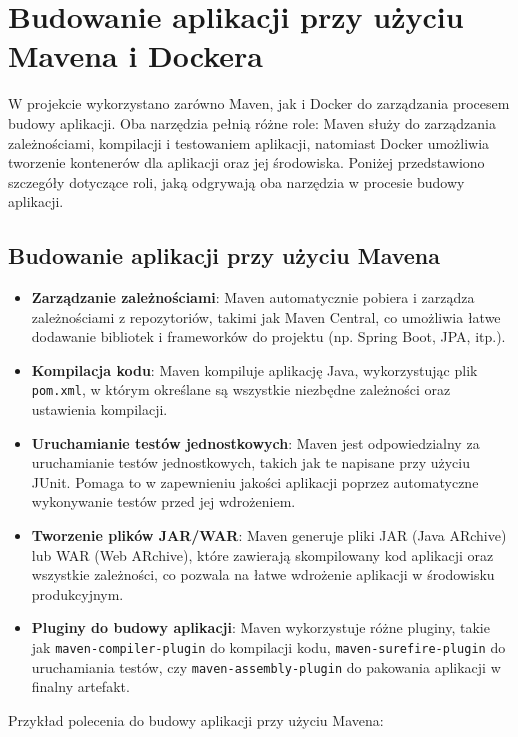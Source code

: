 \section{Budowanie aplikacji przy użyciu Mavena i Dockera}

W projekcie wykorzystano zarówno Maven, jak i Docker do zarządzania procesem budowy aplikacji. Oba narzędzia pełnią różne role: Maven służy do zarządzania zależnościami, kompilacji i testowaniem aplikacji, natomiast Docker umożliwia tworzenie kontenerów dla aplikacji oraz jej środowiska. Poniżej przedstawiono szczegóły dotyczące roli, jaką odgrywają oba narzędzia w procesie budowy aplikacji.

\subsection{Budowanie aplikacji przy użyciu Mavena}

\begin{itemize}
    \item \textbf{Zarządzanie zależnościami}: Maven automatycznie pobiera i zarządza zależnościami z repozytoriów, takimi jak Maven Central, co umożliwia łatwe dodawanie bibliotek i frameworków do projektu (np. Spring Boot, JPA, itp.).
    \item \textbf{Kompilacja kodu}: Maven kompiluje aplikację Java, wykorzystując plik \texttt{pom.xml}, w którym określane są wszystkie niezbędne zależności oraz ustawienia kompilacji.
    \item \textbf{Uruchamianie testów jednostkowych}: Maven jest odpowiedzialny za uruchamianie testów jednostkowych, takich jak te napisane przy użyciu JUnit. Pomaga to w zapewnieniu jakości aplikacji poprzez automatyczne wykonywanie testów przed jej wdrożeniem.
    \item \textbf{Tworzenie plików JAR/WAR}: Maven generuje pliki JAR (Java ARchive) lub WAR (Web ARchive), które zawierają skompilowany kod aplikacji oraz wszystkie zależności, co pozwala na łatwe wdrożenie aplikacji w środowisku produkcyjnym.
    \item \textbf{Pluginy do budowy aplikacji}: Maven wykorzystuje różne pluginy, takie jak \texttt{maven-compiler-plugin} do kompilacji kodu, \texttt{maven-surefire-plugin} do uruchamiania testów, czy \texttt{maven-assembly-plugin} do pakowania aplikacji w finalny artefakt.
\end{itemize}

Przykład polecenia do budowy aplikacji przy użyciu Mavena:

